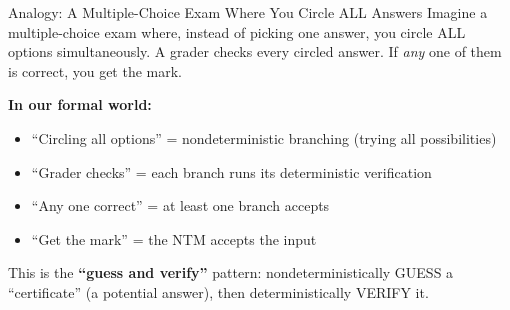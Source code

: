 \documentclass[11pt,a4paper]{article}
\begin{document}
\begin{notebox}{Analogy: A Multiple-Choice Exam Where You Circle ALL Answers}
Imagine a multiple-choice exam where, instead of picking one answer, you circle ALL options simultaneously. A grader checks every circled answer. If \textit{any} one of them is correct, you get the mark.

\textbf{In our formal world:}
\begin{itemize}[nosep]
\item ``Circling all options'' = nondeterministic branching (trying all possibilities)
\item ``Grader checks'' = each branch runs its deterministic verification
\item ``Any one correct'' = at least one branch accepts
\item ``Get the mark'' = the NTM accepts the input
\end{itemize}

This is the \textbf{``guess and verify''} pattern: nondeterministically GUESS a ``certificate'' (a potential answer), then deterministically VERIFY it.
\end{notebox}
\end{document}
